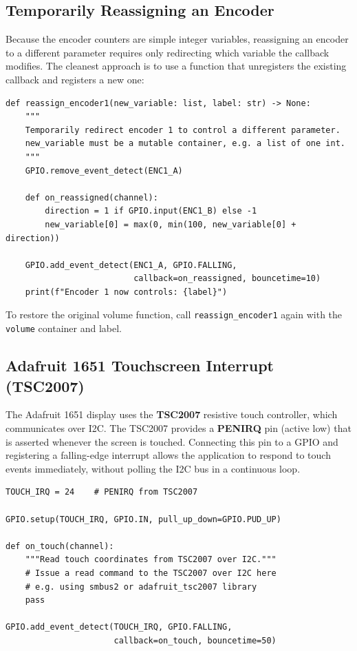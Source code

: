 \subsection{Temporarily Reassigning an Encoder}

Because the encoder counters are simple integer variables, reassigning an encoder
to a different parameter requires only redirecting which variable the callback
modifies. The cleanest approach is to use a function that unregisters the existing
callback and registers a new one:

\begin{verbatim}
def reassign_encoder1(new_variable: list, label: str) -> None:
    """
    Temporarily redirect encoder 1 to control a different parameter.
    new_variable must be a mutable container, e.g. a list of one int.
    """
    GPIO.remove_event_detect(ENC1_A)

    def on_reassigned(channel):
        direction = 1 if GPIO.input(ENC1_B) else -1
        new_variable[0] = max(0, min(100, new_variable[0] + direction))

    GPIO.add_event_detect(ENC1_A, GPIO.FALLING,
                          callback=on_reassigned, bouncetime=10)
    print(f"Encoder 1 now controls: {label}")
\end{verbatim}

\noindent To restore the original volume function, call \texttt{reassign\_encoder1}
again with the \texttt{volume} container and label.

\subsection{Adafruit 1651 Touchscreen Interrupt (TSC2007)}

The Adafruit 1651 display uses the \textbf{TSC2007} resistive touch controller,
which communicates over I2C. The TSC2007 provides a \textbf{PENIRQ} pin (active
low) that is asserted whenever the screen is touched. Connecting this pin to a
GPIO and registering a falling-edge interrupt allows the application to respond to
touch events immediately, without polling the I2C bus in a continuous loop.

\begin{verbatim}
TOUCH_IRQ = 24    # PENIRQ from TSC2007

GPIO.setup(TOUCH_IRQ, GPIO.IN, pull_up_down=GPIO.PUD_UP)

def on_touch(channel):
    """Read touch coordinates from TSC2007 over I2C."""
    # Issue a read command to the TSC2007 over I2C here
    # e.g. using smbus2 or adafruit_tsc2007 library
    pass

GPIO.add_event_detect(TOUCH_IRQ, GPIO.FALLING,
                      callback=on_touch, bouncetime=50)
\end{verbatim}

